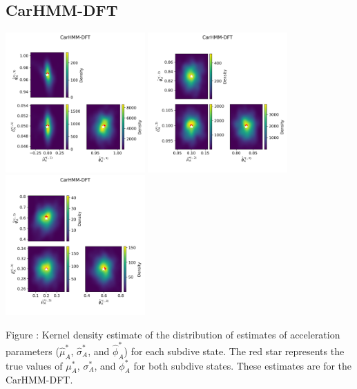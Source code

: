 \documentclass{article}
\begin{document}
        \subsection{CarHMM-DFT}
        \begin{center}
        \includegraphics[width=2.1in]{../Plots/hmm_FV_MLE_density_A_0_0.png}
        \includegraphics[width=2.1in]{../Plots/hmm_FV_MLE_density_A_0_1.png}
        \includegraphics[width=2.1in]{../Plots/hmm_FV_MLE_density_A_0_2.png}
        \end{center}
        
        \noindent Figure : Kernel density estimate of the distribution of estimates of acceleration parameters ($\hat \mu^*_A$, $\hat \sigma^*_A$, and $\hat \phi^*_A$) for each subdive state. The red star represents the true values of $\mu^*_A$, $\sigma^*_A$, and $\phi^*_A$ for both subdive states. These estimates are for the CarHMM-DFT.
        \addtocounter{fignum}{1}
        
\end{document}
